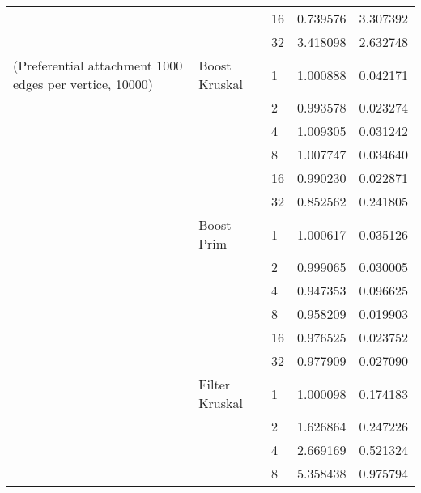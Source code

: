 \begin{tabular}{lllrr}
                                                       &                     & 16 &  0.739576 &  3.307392 \\
                                                       &                     & 32 &  3.418098 &  2.632748 \\
(Preferential attachment 1000 edges per vertice, 10000) & Boost Kruskal & 1  &  1.000888 &  0.042171 \\
                                                       &                     & 2  &  0.993578 &  0.023274 \\
                                                       &                     & 4  &  1.009305 &  0.031242 \\
                                                       &                     & 8  &  1.007747 &  0.034640 \\
                                                       &                     & 16 &  0.990230 &  0.022871 \\
                                                       &                     & 32 &  0.852562 &  0.241805 \\
                                                       & Boost Prim & 1  &  1.000617 &  0.035126 \\
                                                       &                     & 2  &  0.999065 &  0.030005 \\
                                                       &                     & 4  &  0.947353 &  0.096625 \\
                                                       &                     & 8  &  0.958209 &  0.019903 \\
                                                       &                     & 16 &  0.976525 &  0.023752 \\
                                                       &                     & 32 &  0.977909 &  0.027090 \\
                                                       & Filter Kruskal & 1  &  1.000098 &  0.174183 \\
                                                       &                     & 2  &  1.626864 &  0.247226 \\
                                                       &                     & 4  &  2.669169 &  0.521324 \\
                                                       &                     & 8  &  5.358438 &  0.975794 \\

\end{tabular}
